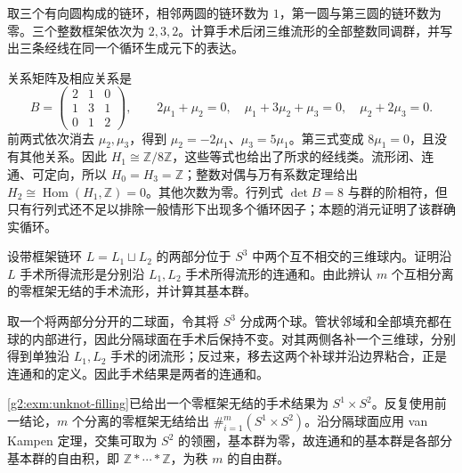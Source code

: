 \begin{exercise}\label{g2:ex:chain-surgery-eight}
	取三个有向圆构成的链环，相邻两圆的链环数为 \(1\)，第一圆与第三圆的链环数为零。三个整数框架依次为 \(2,3,2\)。计算手术后闭三维流形的全部整数同调群，并写出三条经线在同一个循环生成元下的表达。
\end{exercise}
\begin{solution}
	关系矩阵及相应关系是
	\[
		B=\begin{pmatrix}2&1&0\\1&3&1\\0&1&2\end{pmatrix},
		\qquad 2\mu_1+\mu_2=0,\quad
		\mu_1+3\mu_2+\mu_3=0,\quad \mu_2+2\mu_3=0.
	\]
	前两式依次消去 \(\mu_2,\mu_3\)，得到 \(\mu_2=-2\mu_1\)、\(\mu_3=5\mu_1\)。第三式变成 \(8\mu_1=0\)，且没有其他关系。因此 \(H_1\cong\mathbb Z/8\mathbb Z\)，这些等式也给出了所求的经线类。流形闭、连通、可定向，所以 \(H_0=H_3=\mathbb Z\)；整数对偶与万有系数定理给出 \(H_2\cong\operatorname{Hom}(H_1,\mathbb Z)=0\)。其他次数为零。行列式 \(\det B=8\) 与群的阶相符，但只有行列式还不足以排除一般情形下出现多个循环因子；本题的消元证明了该群确实循环。
\end{solution}

\begin{exercise}\label{g2:ex:split-surgery-sum}
	设带框架链环 \(L=L_1\sqcup L_2\) 的两部分位于 \(S^3\) 中两个互不相交的三维球内。证明沿 \(L\) 手术所得流形是分别沿 \(L_1,L_2\) 手术所得流形的连通和。由此辨认 \(m\) 个互相分离的零框架无结的手术流形，并计算其基本群。
\end{exercise}
\begin{solution}
	取一个将两部分分开的二球面，令其将 \(S^3\) 分成两个球。管状邻域和全部填充都在球的内部进行，因此分隔球面在手术后保持不变。对其两侧各补一个三维球，分别得到单独沿 \(L_1,L_2\) 手术的闭流形；反过来，移去这两个补球并沿边界粘合，正是连通和的定义。因此手术结果是两者的连通和。

	\cref{g2:exm:unknot-filling}已给出一个零框架无结的手术结果为 \(S^1\times S^2\)。反复使用前一结论，\(m\) 个分离的零框架无结给出 \(\#_{i=1}^{m}(S^1\times S^2)\)。沿分隔球面应用 van Kampen 定理，交集可取为 \(S^2\) 的领圈，基本群为零，故连通和的基本群是各部分基本群的自由积，即 \(\mathbb Z*\cdots*\mathbb Z\)，为秩 \(m\) 的自由群。
\end{solution}

